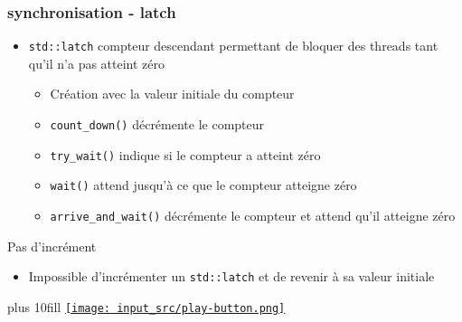 \documentclass[C++.tex]{subfiles}
\begin{document}
\begin{frame}[fragile]
	\frametitle{synchronisation - latch}
	\begin{itemize}
		\item \lstinline|std::latch| compteur descendant permettant de bloquer des threads tant qu'il n'a pas atteint zéro 
		\begin{itemize}
			\item Création avec la valeur initiale du compteur
			\item \lstinline|count_down()| décrémente le compteur
			\item \lstinline|try_wait()| indique si le compteur a atteint zéro
			\item \lstinline|wait()| attend jusqu'à ce que le compteur atteigne zéro
			\item \lstinline|arrive_and_wait()| décrémente le compteur et attend qu'il atteigne zéro
		\end{itemize}
	\end{itemize}

	\begin{alertblock}{Pas d'incrément}
		\begin{itemize}
			\item Impossible d'incrémenter un \lstinline|std::latch| et de revenir à sa valeur initiale
		\end{itemize}
	\end{alertblock}

	\vskip 10mm plus 10fill
	\hfill
	\href{https://godbolt.org/#g:!((g:!((g:!((h:codeEditor,i:(filename:'1',fontScale:14,fontUsePx:'0',j:1,lang:c%2B%2B,selection:(endColumn:2,endLineNumber:29,positionColumn:2,positionLineNumber:29,selectionStartColumn:1,selectionStartLineNumber:1,startColumn:1,startLineNumber:1),source:'%23include+%3Ciostream%3E%0A%23include+%3Clatch%3E%0A%23include+%3Cthread%3E%0A%0Aint+main()%0A%7B%0A++const+size_t+nbLatch+%3D+5%3B%0A++std::latch+l1(nbLatch)%3B%0A++std::latch+l2(1)%3B%0A%0A++auto+work+%3D+%5B%26%5D+(int+i)%0A++++++++++++++%7B%0A++++++++++++++++std::cout+%3C%3C+%22Entree+foo%22+%3C%3C+i+%3C%3C+%22%5Cn%22%3B%0A++++++++++++++++l1.count_down()%3B%0A++++++++++++++++l2.wait()%3B%0A++++++++++++++++std::cout+%3C%3C+%22Sortie+foo%22+%3C%3C+i+%3C%3C+%22%5Cn%22%3B%0A++++++++++++++%7D%3B%0A%0A++std::cout+%3C%3C+%22Demarrage%5Cn%22%3B%0A++std::jthread+t%5BnbLatch%5D%3B%0A++for(size_t+i+%3D+0%3B+i+%3C+nbLatch%3B+%2B%2Bi)%0A++%7B%0A++++t%5Bi%5D+%3D+std::jthread(work,+i)%3B%0A++%7D%0A%0A++l1.wait()%3B%0A++std::cout+%3C%3C+%22Thread+OK%5Cn%22%3B%0A++l2.count_down()%3B%0A%7D'),l:'5',n:'0',o:'C%2B%2B+source+%231',t:'0')),k:50,l:'4',n:'0',o:'',s:0,t:'0'),(g:!((h:executor,i:(argsPanelShown:'1',compilationPanelShown:'0',compiler:g122,compilerName:'',compilerOutShown:'0',execArgs:'',execStdin:'',fontScale:14,fontUsePx:'0',j:1,lang:c%2B%2B,libs:!((name:boost,ver:'175')),options:'-std%3Dc%2B%2B20+-Wall+-Wextra+-pedantic+-pthread',source:1,stdinPanelShown:'1',tree:'1',wrap:'0'),l:'5',n:'0',o:'Executor+x86-64+gcc+12.2+(C%2B%2B,+Editor+%231)',t:'0')),header:(),k:50,l:'4',n:'0',o:'',s:0,t:'0')),l:'2',n:'0',o:'',t:'0')),version:4}{\texttt{[image: input\_src/play-button.png]}}
\end{frame}
\end{document}
